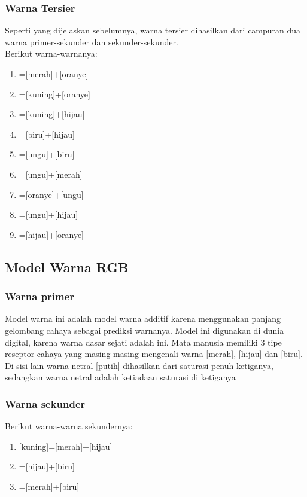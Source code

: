 \documentclass[a4paper,12pt]{article}
\newcommand{\warnalnbl}[1]{
  \tikz[baseline=-0.5\ht\strutbox]{
    \node[shape=rectangle, draw=black, fill=black, minimum height=1.5em, inner sep= 2pt, text=white]{#1}
  }
}
\begin{document}
\subsubsection{Warna Tersier}
Seperti yang dijelaskan sebelumnya, warna tersier dihasilkan dari campuran dua warna primer-sekunder dan sekunder-sekunder.\\
Berikut warna-warnanya:
\begin{enumerate}
  \item {}=[merah]+[oranye]
  \item {}=[kuning]+[oranye]
  \item {}=[kuning]+[hijau]
  \item {}=[biru]+[hijau]
  \item {}=[ungu]+[biru]
  \item {}=[ungu]+[merah]
  \item {}=[oranye]+[ungu]
  \item {}=[ungu]+[hijau]
  \item {}=[hijau]+[oranye]
\end{enumerate}
\newpage
\subsection{Model Warna RGB}
\subsubsection{Warna primer}
Model warna ini adalah model warna additif karena menggunakan panjang gelombang cahaya sebagai prediksi warnanya. Model ini digunakan di dunia digital, karena warna dasar sejati adalah ini. Mata manusia memiliki 3 tipe reseptor cahaya yang masing masing mengenali warna [merah], [hijau] dan [biru]. Di sisi lain warna netral [putih] dihasilkan dari saturasi penuh ketiganya, sedangkan warna netral \warnalnbl{Hitam} adalah ketiadaan saturasi di ketiganya

\subsubsection{Warna sekunder}
Berikut warna-warna sekundernya:
\begin{enumerate}
  \item {}[kuning]=[merah]+[hijau]
  \item {}=[hijau]+[biru]
  \item {}=[merah]+[biru]
\end{enumerate}
\end{document}
